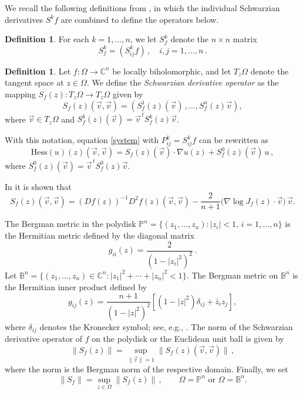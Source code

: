 \documentclass[12pt]{amsart}
\theoremstyle{definition}
\newtheorem{definition}[theorem]{Definition}
\theoremstyle{remark}
\def\bq{\begin{equation}}
\def\eq{\end{equation}}
\def\noi{\noindent}
\def\S{{ S^{k}_{ij}}}
\def\Cn{{\mathbb C}^n}
\numberwithin{equation}{section}
\begin{document}
We recall the following definitions from \cite{He}, in which the individual
Schwarzian derivatives $S^kf$ are combined to define the operators below.

\begin{definition}
For each $k=1,\ldots,n$, we let $S^{k}_f$ denote the $n\times n$ matrix
\[
S^k_f= (\S f)\, ,\quad i,j=1,\ldots,n\, .
\]
\end{definition}

\begin{definition}
Let $f:\Omega\rightarrow\Cn$ be locally biholomorphic, and let $T_z\Omega$
denote the tangent space at $z\in\Omega$. We define the \textit{Schwarzian
derivative operator} as the mapping
$S_f(z):T_z\Omega \to T_z\Omega$ given by
\[
S_f(z)(\vec{v},\vec{v})=\left(S^1_f(z)(\vec{v})\,,\ldots,S^{n}_f(z)\vec{v}\right),
\]
where $\vec{v}\in T_z \Omega$ and $S^k_f(z)(\vec{v})=\vec{v}^{\,t}S^k_f(z)\vec{v}$.
\end{definition}

\noi With this notation, equation \eqref{system} with $P^k_{ij}=\S f$ can be
rewritten as
\bq\label{Hess}
\mathrm{Hess}(u)(z)(\vec{v},\vec{v})
= S_f(z)(\vec{v})\cdot \nabla u(z)+S^0_f(z)(\vec{v})\,u\, ,
\eq
where $S^0_f(z)(\vec{v})=\vec{v}^{\,t}S^0_f(z)\vec{v}$.

In \cite{He} it is shown that
\begin{equation}\label{sf operator}
S_f(z)(\vec{v},\vec{v})=(Df(z))^{-1}D^2f(z)(\vec{v},\vec{v})
-\frac{2}{n+1}\bigl(\nabla\log J_f(z)\cdot\vec{v}\bigr)\,\vec{v}.
\end{equation} 

The Bergman metric in the polydisk
$\mathbb{P}^n=\{(z_1,\ldots,z_n): |z_i|<1,\,i=1,\ldots, n\}$
is the Hermitian metric defined by the diagonal matrix
\[
g_{ii}(z)=\frac{2}{(1-|z_i|^2)^2}\,.
\]
Let $\mathbb{B}^n=\{(z_1,\ldots,z_n)\in\mathbb{C}^n:|z_1|^2+\cdots+|z_n|^2<1\}$.
The Bergman metric on $\mathbb{B}^n$ is the Hermitian inner product defined by
\begin{equation}\label{bergman metric}
g_{ij}(z)=\frac{n+1}{(1-|z|^2)^2}\left[(1-|z|^2)\delta_{ij}+\bar{z}_iz_j\right],
\end{equation}
where $\delta_{ij}$ denotes the Kronecker symbol; see, e.g., \cite{krantz1982}.
The norm of the Schwarzian derivative operator of $f$ on the polydisk or the
Euclidean unit ball is given by
\[
\|S_f(z)\|=\sup_{\|\vec{v}\|=1}\|S_f(z)(\vec{v},\vec{v})\|\,,
\]
where the norm is the Bergman norm of the respective domain. Finally, we set
\[
\|S_f\| = \sup_{z\in\Omega}\|S_f(z)\|\,,\qquad \Omega=\mathbb{P}^n
\text{ or }\Omega=\mathbb{B}^n.
\]
\end{document}
